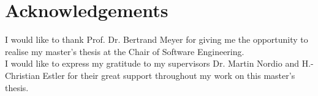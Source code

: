 


\chapter*{Acknowledgements}

I would like to thank Prof. Dr. Bertrand Meyer for giving me the opportunity to realise my master's thesis at the Chair of Software Engineering. \\

I would like to express my gratitude to my supervisors Dr. Martin Nordio and H.-Christian Estler for their great support throughout my work on this master's thesis.



